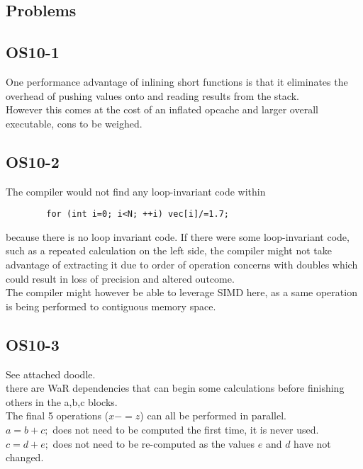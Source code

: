 \documentclass[12pt]{article}
\begin{document}
	\maketitle
	
	\clearpage
	\begin{flushleft}
		\section*{Problems}
		
		\subsection*{OS10-1}
		One performance advantage of inlining short functions is that it eliminates the overhead of pushing values onto and reading results from the stack.\\
		However this comes at the cost of an inflated opcache and larger overall executable, cons to be weighed.
		
		\subsection*{OS10-2}
		The compiler would not find any loop-invariant code within
		\begin{lstlisting}
		for (int i=0; i<N; ++i) vec[i]/=1.7;
		\end{lstlisting}
		because there is no loop invariant code. If there were some loop-invariant code, such as a repeated calculation on the left side, the compiler might not take advantage of extracting it due to order of operation concerns with doubles which could result in loss of precision and altered outcome.\\
		
		The compiler might however be able to leverage SIMD here, as a same operation is being performed to contiguous memory space.\\
		
		\subsection*{OS10-3}
		See attached doodle.\\
		
		there are WaR dependencies that can begin some calculations before finishing others in the a,b,c blocks.\\
		The final 5 operations ($x-=z$) can all be performed in parallel.\\
		$a=b+c;$ does not need to be computed the first time, it is never used.\\
		$c=d+e;$ does not need to be re-computed as the values $e$ and $d$ have not changed.\\
		

\end{flushleft}
\end{document}
